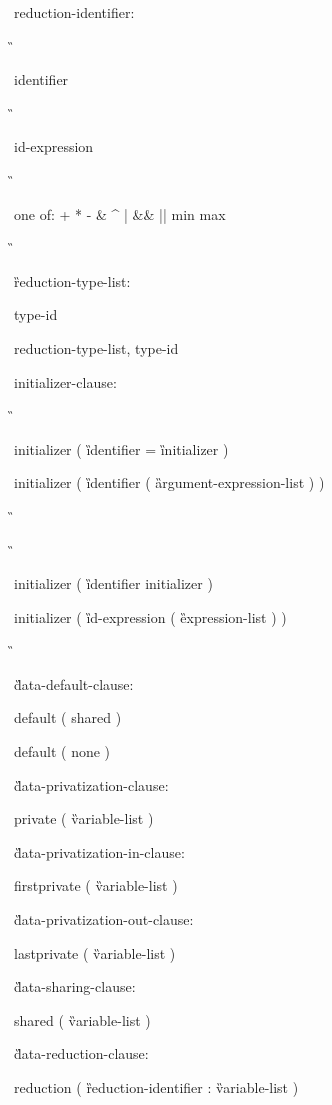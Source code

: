 {reduction-identifier: 

\G\cspecificstart

\I identifier 

\G\cspecificend

\cppspecificstart

\I id-expression 

\G\cppspecificend

\ccppspecificstart

\I one of: \C + * - \& \^ { } \C | \&\& || min max 

\G\ccppspecificend

\G reduction-type-list: 

\I type-id 

\I reduction-type-list, type-id 

\begin{samepage}
initializer-clause: 

\G\cspecificstart

\C\I initializer ( \G identifier \C = \G initializer \C )

\C\I initializer ( \G identifier \C ( \G argument-expression-list \C ) ) 

\G\cspecificend
\end{samepage}

\G\cppspecificstart

\C\I initializer \C ( \G identifier initializer \C )

\I initializer \C ( \G id-expression \C ( \G expression-list \C ) ) 

\G\cppspecificend

\G data-default-clause:

\C\I default ( shared )

\I default ( none )

\G data-privatization-clause:

\C\I private ( \G variable-list \C )

\G data-privatization-in-clause:

\C\I firstprivate ( \G variable-list \C )

\G data-privatization-out-clause:

\C\I lastprivate ( \G variable-list \C )

\G data-sharing-clause:

\C\I shared ( \G variable-list \C )

\G data-reduction-clause:

\C\I reduction ( \G reduction-identifier \C : \G variable-list \C )

}

